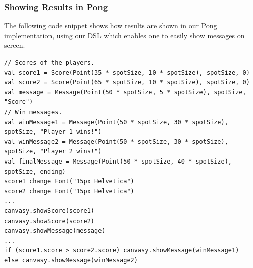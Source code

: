 \documentclass[journal,onecolumn, 9pt]{IEEEtran}
\theoremstyle{definition}
\begin{document}
\subsubsection{Showing Results in Pong}
The following code snippet shows how results are shown in our Pong implementation, using our DSL which enables one to easily show messages on screen.
\begin{verbatim}
// Scores of the players.
val score1 = Score(Point(35 * spotSize, 10 * spotSize), spotSize, 0)
val score2 = Score(Point(65 * spotSize, 10 * spotSize), spotSize, 0)
val message = Message(Point(50 * spotSize, 5 * spotSize), spotSize, "Score")
// Win messages.
val winMessage1 = Message(Point(50 * spotSize, 30 * spotSize), spotSize, "Player 1 wins!")
val winMessage2 = Message(Point(50 * spotSize, 30 * spotSize), spotSize, "Player 2 wins!")
val finalMessage = Message(Point(50 * spotSize, 40 * spotSize), spotSize, ending)
score1 change Font("15px Helvetica")
score2 change Font("15px Helvetica")
...
canvasy.showScore(score1)
canvasy.showScore(score2)
canvasy.showMessage(message)
...
if (score1.score > score2.score) canvasy.showMessage(winMessage1)
else canvasy.showMessage(winMessage2)
\end{verbatim}
\end{document}
